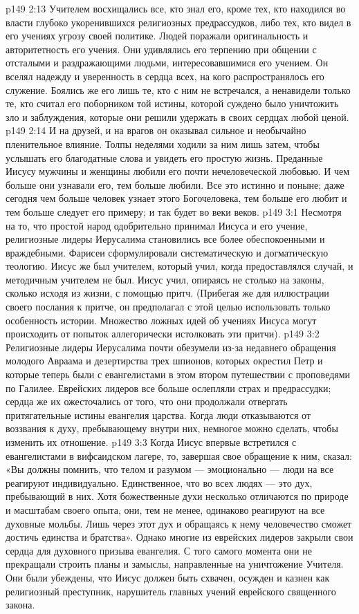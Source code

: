 \vs p149 2:13 Учителем восхищались все, кто знал его, кроме тех, кто находился во власти глубоко укоренившихся религиозных предрассудков, либо тех, кто видел в его учениях угрозу своей политике. Людей поражали оригинальность и авторитетность его учения. Они удивлялись его терпению при общении с отсталыми и раздражающими людьми, интересовавшимися его учением. Он вселял надежду и уверенность в сердца всех, на кого распространялось его служение. Боялись же его лишь те, кто с ним не встречался, а ненавидели только те, кто считал его поборником той истины, которой суждено было уничтожить зло и заблуждения, которые они решили удержать в своих сердцах любой ценой.
\vs p149 2:14 И на друзей, и на врагов он оказывал сильное и необычайно пленительное влияние. Толпы неделями ходили за ним лишь затем, чтобы услышать его благодатные слова и увидеть его простую жизнь. Преданные Иисусу мужчины и женщины любили его почти нечеловеческой любовью. И чем больше они узнавали его, тем больше любили. Все это истинно и поныне; даже сегодня чем больше человек узнает этого Богочеловека, тем больше его любит и тем больше следует его примеру; и так будет во веки веков.
\vs p149 3:1 Несмотря на то, что простой народ одобрительно принимал Иисуса и его учение, религиозные лидеры Иерусалима становились все более обеспокоенными и враждебными. Фарисеи сформулировали систематическую и догматическую теологию. Иисус же был учителем, который учил, когда предоставлялся случай, и методичным учителем не был. Иисус учил, опираясь не столько на законы, сколько исходя из жизни, с помощью притч. (Прибегая же для иллюстрации своего послания к притче, он предполагал с этой целью использовать только  особенность истории. Множество ложных идей об учениях Иисуса могут происходить от попыток аллегорически истолковать эти притчи).
\vs p149 3:2 Религиозные лидеры Иерусалима почти обезумели из\hyp{}за недавнего обращения молодого Авраама и дезертирства трех шпионов, которых окрестил Петр и которые теперь были с евангелистами в этом втором путешествии с проповедями по Галилее. Еврейских лидеров все больше ослепляли страх и предрассудки; сердца же их ожесточались от того, что они продолжали отвергать притягательные истины евангелия царства. Когда люди отказываются от воззвания к духу, пребывающему внутри них, немногое можно сделать, чтобы изменить их отношение.
\vs p149 3:3 Когда Иисус впервые встретился с евангелистами в вифсаидском лагере, то, завершая свое обращение к ним, сказал: «Вы должны помнить, что телом и разумом --- эмоционально --- люди на все реагируют индивидуально. Единственное, что во всех людях  --- это дух, пребывающий в них. Хотя божественные духи несколько отличаются по природе и масштабам своего опыта, они, тем не менее, одинаково реагируют на все духовные мольбы. Лишь через этот дух и обращаясь к нему человечество сможет достичь единства и братства». Однако многие из еврейских лидеров закрыли свои сердца для духовного призыва евангелия. С того самого момента они не прекращали строить планы и замыслы, направленные на уничтожение Учителя. Они были убеждены, что Иисус должен быть схвачен, осужден и казнен как религиозный преступник, нарушитель главных учений еврейского священного закона.
